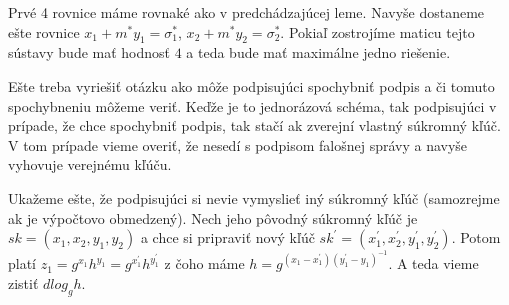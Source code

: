\begin{dokaz}
Prvé 4 rovnice máme rovnaké ako v predchádzajúcej leme. Navyše dostaneme ešte rovnice $x_1 + m^*y_1 = \sigma_1^*$, 
$x_2 + m^* y_2 = \sigma_2^*$.
Pokiaľ zostrojíme maticu tejto sústavy bude mať hodnosť $4$ a teda bude mať maximálne jedno riešenie.
\end{dokaz}


Ešte treba vyriešiť otázku ako môže podpisujúci spochybniť podpis 
a či tomuto spochybneniu môžeme veriť.
Keďže je to jednorázová schéma, tak podpisujúci v prípade,
že chce spochybniť podpis, tak stačí ak zverejní vlastný súkromný kľúč.
V tom prípade vieme overiť, že nesedí s podpisom falošnej správy
a navyše vyhovuje verejnému kľúču.

Ukažeme ešte, že podpisujúci si nevie vymyslieť iný súkromný kľúč
(samozrejme ak je výpočtovo obmedzený). 
Nech jeho pôvodný súkromný kľúč je $sk = (x_1, x_2, y_1, y_2)$ a
chce si pripraviť nový kľúč $sk^{'} = (x_1^{'}, x_2^{'}, y_1^{'}, y_2^{'})$.
Potom platí $z_1 = g^{x_1} h^{y_1} = g^{x_1^{'}} h^{y_1^{'}}$ z čoho máme 
$h = g^{(x_1 - x_1^{'})(y_1^{'} - y_1)^{-1}}$.
A teda vieme zistiť $dlog_g h$.

